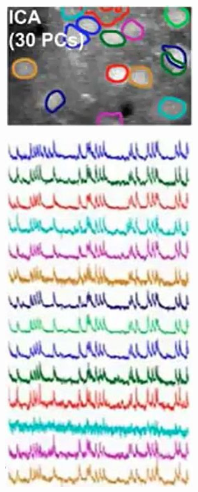 \documentclass[]{article}
\begin{document}
\begin{figure}[H]
\begin{subfigure}[t]{0.3\textwidth}
	\end{subfigure}
	\begin{subfigure}[t]{0.45\textwidth}
		\caption{}\label{fig:rb6}
		\includegraphics[width=0.9\textwidth]{calcium-imaging1}
	\end{subfigure}
	\begin{subfigure}[t]{0.45\textwidth}
		\caption{}\label{fig:rb7}
		\includegraphics[width=0.9\textwidth]{calcium-imaging2}
	\end{subfigure}
\end{figure}
\end{document}
